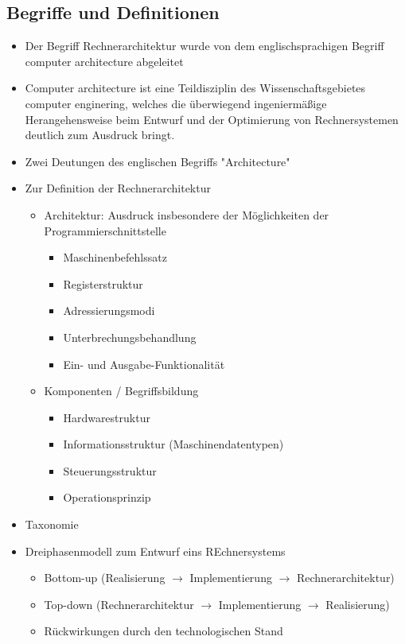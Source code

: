 \subsection{Begriffe und Definitionen}
\begin{itemize}
	\item Der Begriff Rechnerarchitektur wurde von dem englischsprachigen Begriff computer architecture abgeleitet
	\item Computer architecture ist eine Teildisziplin des Wissenschaftsgebietes computer enginering, welches die überwiegend ingeniermäßige Herangehensweise beim Entwurf und der Optimierung von Rechnersystemen deutlich zum Ausdruck bringt.
	\item Zwei Deutungen des englischen Begriffs "Architecture"
	\item Zur Definition der Rechnerarchitektur
	\begin{itemize}
		\item Architektur: Ausdruck insbesondere der Möglichkeiten der Programmierschnittstelle
		\begin{itemize}
			\item Maschinenbefehlssatz
			\item Registerstruktur
			\item Adressierungsmodi
			\item Unterbrechungsbehandlung
			\item Ein- und Ausgabe-Funktionalität
		\end{itemize}
		\item Komponenten / Begriffsbildung
		\begin{itemize}
			\item Hardwarestruktur
			\item Informationsstruktur (Maschinendatentypen)
			\item Steuerungsstruktur
			\item Operationsprinzip
		\end{itemize}
	\end{itemize}
	\item Taxonomie
	\item Dreiphasenmodell zum Entwurf eins REchnersystems
	\begin{itemize}
		\item Bottom-up (Realisierung \(\to\) Implementierung \(\to\) Rechnerarchitektur)
		\item Top-down (Rechnerarchitektur \(\to\) Implementierung \(\to\) Realisierung)
		\item Rückwirkungen durch den technologischen Stand						\end{itemize}
\end{itemize}




